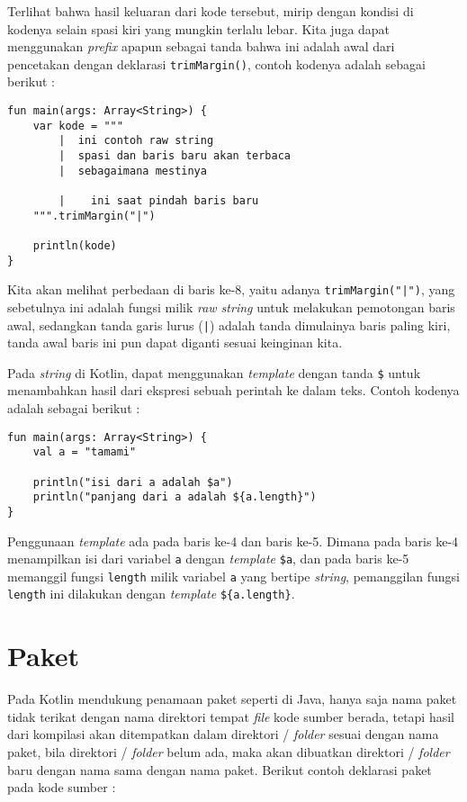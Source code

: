 Terlihat bahwa hasil keluaran dari kode tersebut, mirip dengan kondisi di kodenya selain spasi kiri yang mungkin terlalu lebar. Kita juga dapat menggunakan \textit{prefix} apapun sebagai tanda bahwa ini adalah awal dari pencetakan dengan deklarasi \texttt{trimMargin()}, contoh kodenya adalah sebagai berikut :

\begin{lstlisting}
fun main(args: Array<String>) {
    var kode = """
        |  ini contoh raw string
        |  spasi dan baris baru akan terbaca
        |  sebagaimana mestinya
        
        |    ini saat pindah baris baru
    """.trimMargin("|")
    
    println(kode)
}
\end{lstlisting}

Kita akan melihat perbedaan di baris ke-8, yaitu adanya \texttt{trimMargin("|")}, yang sebetulnya ini adalah fungsi milik \textit{raw string} untuk melakukan pemotongan baris awal, sedangkan tanda garis lurus (\texttt{|}) adalah tanda dimulainya baris paling kiri, tanda awal baris ini pun dapat diganti sesuai keinginan kita.

Pada \textit{string} di Kotlin, dapat menggunakan \textit{template} dengan tanda \texttt{\$} untuk menambahkan hasil dari ekspresi sebuah perintah ke dalam teks. Contoh kodenya adalah sebagai berikut :

\begin{lstlisting}
fun main(args: Array<String>) {
	val a = "tamami"
	
	println("isi dari a adalah $a")
	println("panjang dari a adalah ${a.length}")
}
\end{lstlisting}

Penggunaan \textit{template} ada pada baris ke-4 dan baris ke-5. Dimana pada baris ke-4 menampilkan isi dari variabel \texttt{a} dengan \textit{template} \texttt{\$a}, dan pada baris ke-5 memanggil fungsi \texttt{length} milik variabel \texttt{a} yang bertipe \textit{string}, pemanggilan fungsi \texttt{length} ini dilakukan dengan \textit{template} \texttt{\$\{a.length\}}.

\section{Paket}

Pada Kotlin mendukung penamaan paket seperti di Java, hanya saja nama paket tidak terikat dengan nama direktori tempat \textit{file} kode sumber berada, tetapi hasil dari kompilasi akan ditempatkan dalam direktori / \textit{folder} sesuai dengan nama paket, bila direktori / \textit{folder} belum ada, maka akan dibuatkan direktori / \textit{folder} baru dengan nama sama dengan nama paket. Berikut contoh deklarasi paket pada kode sumber :

